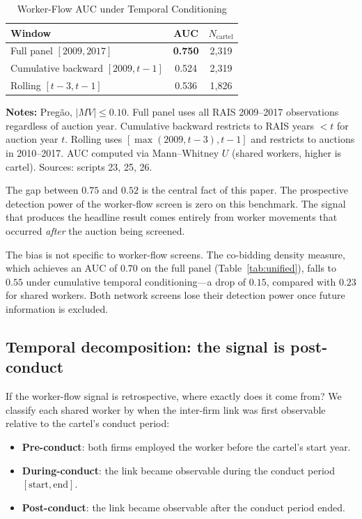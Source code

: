 \begin{table}[htbp]
\centering
\caption{Worker-Flow AUC under Temporal Conditioning}\label{tab:temporal}
\begin{tabular}{lcc}
\toprule
Window & AUC & $N_{\text{cartel}}$ \\
\midrule
Full panel $[2009, 2017]$ & \textbf{0.750} & 2{,}319 \\
Cumulative backward $[2009, t-1]$ & 0.524 & 2{,}319 \\
Rolling $[t-3, t-1]$ & 0.536 & 1{,}826 \\
\bottomrule
\end{tabular}
\vspace{0.5em}
\begin{minipage}{0.85\textwidth}
\scriptsize{\textbf{Notes:} Preg\~{a}o, $\lvert MV \rvert \le 0.10$. Full panel uses all RAIS 2009--2017 observations regardless of auction year. Cumulative backward restricts to RAIS years $< t$ for auction year $t$. Rolling uses $[\max(2009, t-3), t-1]$ and restricts to auctions in 2010--2017. AUC computed via Mann--Whitney $U$ (shared workers, higher is cartel). Sources: scripts 23, 25, 26.\par}
\end{minipage}
\end{table}

The gap between $0.75$ and $0.52$ is the central fact of this paper. The prospective detection power of the worker-flow screen is zero on this benchmark. The signal that produces the headline result comes entirely from worker movements that occurred \emph{after} the auction being screened.

The bias is not specific to worker-flow screens. The co-bidding density measure, which achieves an AUC of $0.70$ on the full panel (Table~\ref{tab:unified}), falls to $0.55$ under cumulative temporal conditioning---a drop of $0.15$, compared with $0.23$ for shared workers. Both network screens lose their detection power once future information is excluded.

\subsection{Temporal decomposition: the signal is post-conduct}\label{sec:decomposition}

If the worker-flow signal is retrospective, where exactly does it come from? We classify each shared worker by when the inter-firm link was first observable relative to the cartel's conduct period:
\begin{itemize}
\item \textbf{Pre-conduct}: both firms employed the worker before the cartel's start year.
\item \textbf{During-conduct}: the link became observable during the conduct period $[\text{start}, \text{end}]$.
\item \textbf{Post-conduct}: the link became observable after the conduct period ended.
\end{itemize}

